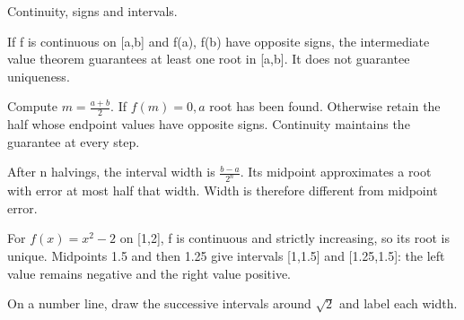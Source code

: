 \documentclass[11pt]{article}
\begin{document}
Continuity, signs and intervals.\par
{}
If f is continuous on [a,b] and f(a), f(b) have opposite signs, the intermediate value theorem guarantees at least one root in [a,b]. It does not guarantee uniqueness.\par
Compute \(m=\frac{a+b}{2}\). If \(f(m)=0, a\) root has been found. Otherwise retain the half whose endpoint values have opposite signs. Continuity maintains the guarantee at every step.\par
After n halvings, the interval width is \(\frac{b-a}{2^{n}}\). Its midpoint approximates a root with error at most half that width. Width is therefore different from midpoint error.\par
{}
For \(f(x)=x^{2}-2\) on [1,2], f is continuous and strictly increasing, so its root is unique. Midpoints 1.5 and then 1.25 give intervals [1,1.5] and [1.25,1.5]: the left value remains negative and the right value positive.\par
{}
On a number line, draw the successive intervals around \(\sqrt{2}\) and label each width.\par
\end{document}
